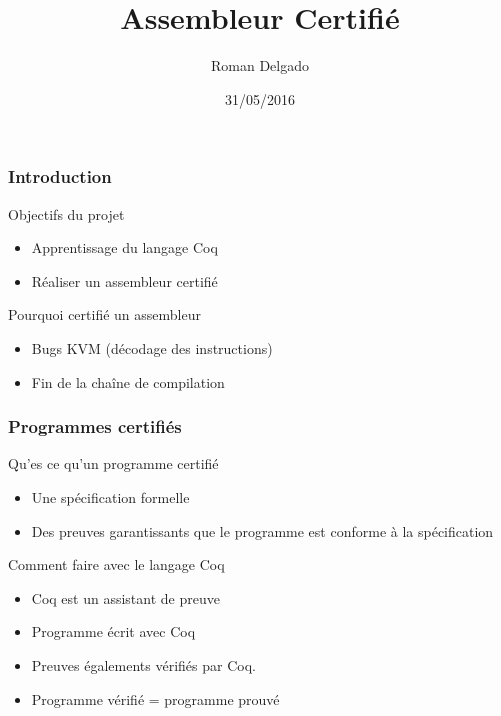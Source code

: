 \documentclass{beamer}
\title{Assembleur Certifié}
\author{Roman Delgado}
\institute[\textsc{Upmc}]{Université Pierre et Marie Curie}
\date{31/05/2016}
\begin{document}
\begin{frame}

\titlepage

\end{frame}


\begin{frame}
  \frametitle{Introduction}

  \begin{block}{Objectifs du projet}
    \begin{itemize}
    \item Apprentissage du langage Coq
    \item Réaliser un assembleur certifié
    \end{itemize}
  \end{block}

  \begin{block}{Pourquoi certifié un assembleur}
    \begin{itemize}
    \item Bugs KVM (décodage des instructions)
    \item Fin de la chaîne de compilation 
    \end{itemize}
  \end{block}   
\end{frame}
\begin{frame}[b,fragile]

\frametitle{Programmes certifiés}

\vfill

\begin{block}{Qu'es ce qu'un programme certifié}
  \begin{itemize}
  \item Une spécification formelle
  \item Des preuves garantissants que le programme est conforme à la spécification
  \end{itemize}
\end{block}
\begin{block}{Comment faire avec le langage Coq}
  \begin{itemize}
  \item Coq est un assistant de preuve
  \item Programme écrit avec Coq 
  \item Preuves égalements vérifiés par Coq.
  \item Programme vérifié = programme prouvé      
  \end{itemize}
\end{block}
\vfill


\end{frame}
\end{document}
